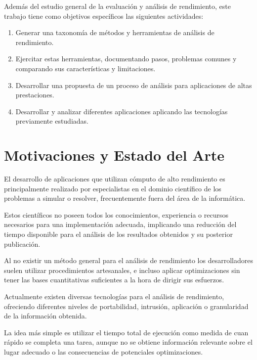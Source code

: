 \documentclass[a4paper]{article}
\begin{document}
  Adem\'as del estudio general de la evaluaci\'on y an\'alisis de rendimiento,
  este trabajo tiene como objetivos espec\'ificos las siguientes actividades:

  \smallskip

  \begin{enumerate}
  \item Generar una taxonom\'ia de m\'etodos y herramientas de an\'alisis de
    rendimiento.
  \item Ejercitar estas herramientas, documentando pasos, problemas comunes y
    comparando sus caracter\'isticas y limitaciones.
  \item Desarrollar una propuesta de un proceso de an\'alisis para aplicaciones
    de altas prestaciones.
  \item Desarrollar y analizar diferentes aplicaciones aplicando las
    tecnolog\'ias previamente estudiadas.
  \end{enumerate}
  
\section{Motivaciones y Estado del Arte}

El desarrollo de aplicaciones que utilizan c\'omputo de alto rendimiento es
principalmente realizado por especialistas en el dominio cient\'ifico de los
problemas a simular o resolver, frecuentemente fuera del \'area de la
inform\'atica.

\smallskip

Estos cient\'ificos no poseen todos los conocimientos, experiencia o recursos
necesarios para una implementaci\'on adecuada, implicando una reducci\'on del
tiempo disponible para el an\'alisis de los resultados obtenidos y su
posterior publicaci\'on.

\smallskip

Al no existir un m\'etodo general para el an\'alisis de rendimiento los
desarrolladores suelen utilizar procedimientos artesanales, e incluso aplicar
optimizaciones sin tener las bases cuantitativas suficientes a la hora de
dirigir sus esfuerzos.

\smallskip

Actualmente existen diversas tecnolog\'ias para el an\'alisis de rendimiento,
ofreciendo diferentes niveles de portabilidad, intrusi\'on, aplicaci\'on o
granularidad de la informaci\'on obtenida.

\smallskip

La idea m\'as simple es utilizar el tiempo total de ejecuci\'on como medida de
cuan r\'apido se completa una tarea, aunque no se obtiene informaci\'on
relevante sobre el lugar adecuado o las consecuencias de potenciales
optimizaciones.
\end{document}
